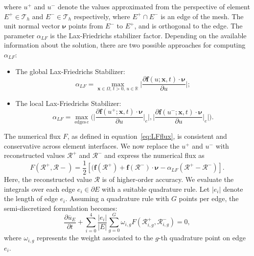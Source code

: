 where $u^+$ and $u^-$ denote the values approximated from the perspective of element 
$E^+ \in \mathcal{T}_h$ and $E^- \in \mathcal{T}_h$ respectively, where
$E^+ \cap E^-$ is an edge of the mesh.
The unit normal vector $\pmb{\nu}$ points from $E^-$ to $E^+$, and is orthogonal to the edge.
The parameter $\alpha_{LF}$ is the Lax-Friedrichs stabilizer factor. 
Depending on the available information about the solution, there are two possible approaches for computing $\alpha_{LF}$:
\begin{itemize}
		  \item The global Lax-Friedrichs Stabilizer: 
					 \begin{equation*}
								\alpha_{LF} = \max_{\mathbf{x}\in \Omega,\, t>0,\, u\in \mathbb{R}}\bigg\lvert \frac{\partial \mathbf{f}(u;\mathbf{x},t)\cdot \pmb{\nu}}{\partial u} \bigg\rvert;
					 \end{equation*}
		  \item The local Lax-Friedrichs Stabilizer:
					 \begin{equation*}
					 \label{eq:loclf}
								\alpha_{LF} = \max_{\text{edges}\,e}\Bigg(\bigg\lvert \frac{\partial \mathbf{f}(u^+;\mathbf{x},t) \cdot \pmb{\nu}}{\partial u}\Big\vert_e \bigg\rvert,
								\bigg\lvert \frac{\partial \mathbf{f}(u^-;\mathbf{x},t) \cdot \pmb{\nu}}{\partial u}\Big\vert_e \bigg\rvert \Bigg).
\end{equation*}
\end{itemize}
The numerical flux $F$, as defined in equation~\eqref{eq:LFflux}, is consistent and conservative across element interfaces. 
We now replace the $u^+$ and $u^-$ with reconstructed values $\mathcal{R}^+$ and $\mathcal{R}^-$ and express the numerical flux as
\begin{equation}\label{eq:reconstructionflux}
		  F(\mathcal{R}^+, \mathcal{R}-) = \frac{1}{2}[(\mathbf{f}(\mathcal{R}^+)+\mathbf{f}(\mathcal{R}^-)\cdot \pmb{\nu} - \alpha_{LF}(\mathcal{R}^+-\mathcal{R}^-)].
\end{equation}
Here, the reconstructed value $\mathcal{R}$ is of higher-order accuracy. We evaluate the
integrals over each edge $e_i \in \partial E$ with a suitable quadrature rule. 
Let $\lvert e_i \rvert$ denote the length of edge $e_i$. 
Assuming a quadrature rule with $G$ points per edge, the semi-discretized formulation becomes:
\begin{equation}\label{eq:fvdis}
		  \frac{\partial \overline{u}_{E}}{\partial t} + \sum_{i=0}^4\frac{\lvert e_i \rvert}{\lvert E \rvert}
		  \sum_{g=0}^G \omega_{i,g} F(\mathcal{R}_{i,g}^+, \mathcal{R}_{i,g}^-) = 0,
\end{equation}
where $\omega_{i,g}$ represents the weight associated to the $g$-th quadrature point on edge $e_i$.

